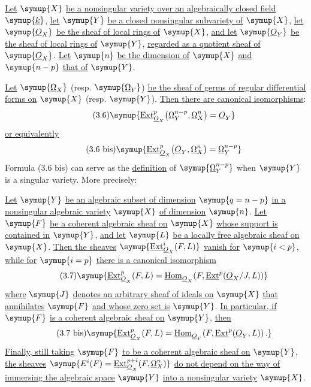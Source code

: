  \uline{Let} $\symup{X}$ \uline{be a nonsingular variety over an algebraically
closed field} $\symup{\underline{k}}$, \uline{let} $\symup{Y}$ \uline{be a closed nonsingular subvariety of} $\symup{X}$, \uline{let}
$\symup{\Osh_X}$ \uline{be the sheaf of local rings of} $\symup{X}$, \uline{and let} $\symup{\Osh_Y}$ \uline{be the sheaf of
local rings of} $\symup{Y}$, \uline{regarded as a quotient sheaf of} $\symup{\Osh_X}$. \uline{Let} $\symup{n}$ \uline{be the
dimension of} $\symup{X}$ \uline{and} $\symup{n-p}$ \uline{that of} $\symup{Y}$.

\uline{Let} $\symup{\underline{\Omega}_X}$ (resp. $\symup{\underline{\Omega}_Y}$) \uline{be the sheaf of germs of regular
differential forms on} $\symup{X}$ (resp. $\symup{Y}$). \uline{Then there are canonical
isomorphisms}:
\begin{equation}\tag{3.6}
  \symup{\Extsh_{\Osh_X}^{p}\bigl(\underline{\Omega}_Y^{n-p},\underline{\Omega}_X^{n}\bigr)=\Osh_Y}
\end{equation}
\uline{or equivalently}
\begin{equation}\tag{3.6 bis}
  \symup{\Extsh_{\Osh_X}^{p}\bigl(\Osh_Y,\underline{\Omega}_X^{n}\bigr)=\underline{\Omega}_Y^{n-p}}
\end{equation}
Formula (3.6 bis) can serve as the \uline{definition} of $\symup{\underline{\Omega}_Y^{n-p}}$ when $\symup{Y}$ is a
singular variety. More precisely:

 \uline{Let} $\symup{Y}$ \uline{be an algebraic subset of dimension} $\symup{q=n-p}$ \uline{in
a nonsingular algebraic variety} $\symup{X}$ \uline{of dimension} $\symup{n}$. \uline{Let} $\symup{F}$ \uline{be a coherent
algebraic sheaf on} $\symup{X}$ \uline{whose support is contained in} $\symup{Y}$, \uline{and let} $\symup{L}$ \uline{be a
locally free algebraic sheaf on} $\symup{X}$. \uline{Then the sheaves}
$\symup{\Extsh_{\Osh_X}^{i}(F,L)}$ \uline{vanish for} $\symup{i<p}$, \uline{while for} $\symup{i=p}$ \uline{there is a canonical
isomorphism}
\begin{equation}\tag{3.7}
  \symup{\Extsh_{\Osh_X}^{p}(F,L)
  =\Homsh_{\Osh_X}\!\left(F,
  \Extsh^{p}(\Osh_X/J,L)\right)}
\end{equation}
\uline{where} $\symup{J}$ \uline{denotes an arbitrary sheaf of ideals on} $\symup{X}$ \uline{that annihilates} $\symup{F}$ \uline{and
whose zero set is} $\symup{Y}$. \uline{In particular, if} $\symup{F}$ \uline{is a coherent algebraic sheaf on}
$\symup{Y}$, \uline{then}
\begin{equation}\tag{3.7 bis}
  \symup{\Extsh_{\Osh_X}^{p}(F,L)
  =\Homsh_{\Osh_Y}\!\left(F,\Extsh^{p}(\Osh_Y,L)\right).}
\end{equation}
\uline{Finally, still taking} $\symup{F}$ \uline{to be a coherent algebraic sheaf on} $\symup{Y}$, \uline{the sheaves}
$\symup{E^{i}(F)=\Extsh_{\Osh_X}^{p+i}(F,\underline{\Omega}_X^{n})}$
\uline{do not depend on the way of immersing the algebraic space} $\symup{Y}$ \uline{into a
nonsingular variety} $\symup{X}$.

